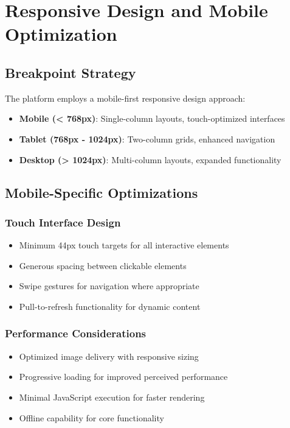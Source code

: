 \documentclass[12pt,a4paper]{article}
\begin{document}
\section{Responsive Design and Mobile Optimization}

\subsection{Breakpoint Strategy}

The platform employs a mobile-first responsive design approach:

\begin{itemize}
    \item \textbf{Mobile (< 768px)}: Single-column layouts, touch-optimized interfaces
    \item \textbf{Tablet (768px - 1024px)}: Two-column grids, enhanced navigation
    \item \textbf{Desktop (> 1024px)}: Multi-column layouts, expanded functionality
\end{itemize}

\subsection{Mobile-Specific Optimizations}

\subsubsection{Touch Interface Design}
\begin{itemize}
    \item Minimum 44px touch targets for all interactive elements
    \item Generous spacing between clickable elements
    \item Swipe gestures for navigation where appropriate
    \item Pull-to-refresh functionality for dynamic content
\end{itemize}

\subsubsection{Performance Considerations}
\begin{itemize}
    \item Optimized image delivery with responsive sizing
    \item Progressive loading for improved perceived performance
    \item Minimal JavaScript execution for faster rendering
    \item Offline capability for core functionality
\end{itemize}
\end{document}
